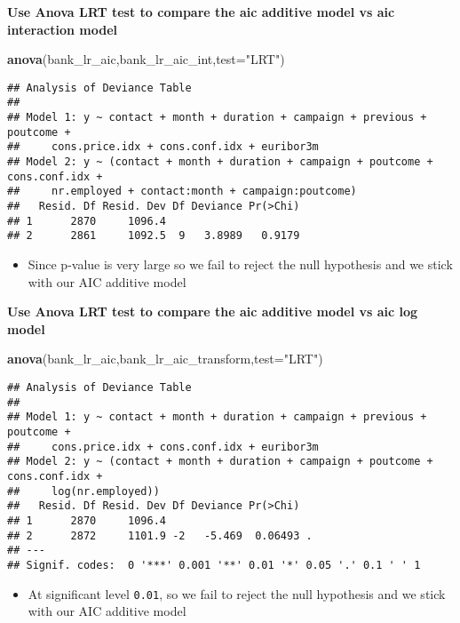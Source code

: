 \documentclass[
]{article}
\newenvironment{Shaded}{\begin{snugshade}}{\end{snugshade}}
\newcommand{\DataTypeTok}[1]{\textcolor[rgb]{0.13,0.29,0.53}{#1}}
\newcommand{\KeywordTok}[1]{\textcolor[rgb]{0.13,0.29,0.53}{\textbf{#1}}}
\newcommand{\NormalTok}[1]{#1}
\newcommand{\StringTok}[1]{\textcolor[rgb]{0.31,0.60,0.02}{#1}}
\providecommand{\tightlist}{%
  \setlength{\itemsep}{0pt}\setlength{\parskip}{0pt}}
\begin{document}
\textbf{Use Anova LRT test to compare the aic additive model vs aic
interaction model}

\begin{Shaded}
\begin{Highlighting}[]
\KeywordTok{anova}\NormalTok{(bank_lr_aic,bank_lr_aic_int,}\DataTypeTok{test=}\StringTok{"LRT"}\NormalTok{)}
\end{Highlighting}
\end{Shaded}

\begin{verbatim}
## Analysis of Deviance Table
## 
## Model 1: y ~ contact + month + duration + campaign + previous + poutcome + 
##     cons.price.idx + cons.conf.idx + euribor3m
## Model 2: y ~ (contact + month + duration + campaign + poutcome + cons.conf.idx + 
##     nr.employed + contact:month + campaign:poutcome)
##   Resid. Df Resid. Dev Df Deviance Pr(>Chi)
## 1      2870     1096.4                     
## 2      2861     1092.5  9   3.8989   0.9179
\end{verbatim}

\begin{itemize}
\tightlist
\item
  Since p-value is very large so we fail to reject the null hypothesis
  and we stick with our AIC additive model
\end{itemize}

\textbf{Use Anova LRT test to compare the aic additive model vs aic log
model}

\begin{Shaded}
\begin{Highlighting}[]
\KeywordTok{anova}\NormalTok{(bank_lr_aic,bank_lr_aic_transform,}\DataTypeTok{test=}\StringTok{"LRT"}\NormalTok{)}
\end{Highlighting}
\end{Shaded}

\begin{verbatim}
## Analysis of Deviance Table
## 
## Model 1: y ~ contact + month + duration + campaign + previous + poutcome + 
##     cons.price.idx + cons.conf.idx + euribor3m
## Model 2: y ~ (contact + month + duration + campaign + poutcome + cons.conf.idx + 
##     log(nr.employed))
##   Resid. Df Resid. Dev Df Deviance Pr(>Chi)  
## 1      2870     1096.4                       
## 2      2872     1101.9 -2   -5.469  0.06493 .
## ---
## Signif. codes:  0 '***' 0.001 '**' 0.01 '*' 0.05 '.' 0.1 ' ' 1
\end{verbatim}

\begin{itemize}
\tightlist
\item
  At significant level \texttt{0.01}, so we fail to reject the null
  hypothesis and we stick with our AIC additive model
\end{itemize}
\end{document}
